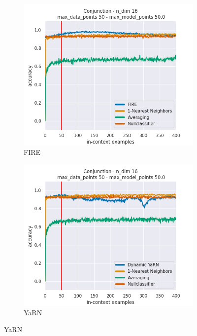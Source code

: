\documentclass[letterpaper]{article} %
\begin{document}
\begin{figure}[tp]
\begin{subfigure}[t]{0.24\linewidth}
    \end{subfigure}
    \begin{subfigure}[t]{0.24\linewidth}
        \includegraphics[width=\linewidth]{AnonymousSubmission/LaTeX/imgs/experiments/conjunction/fire.png}
        \caption{FIRE}
    \end{subfigure}
    \begin{subfigure}[t]{0.24\linewidth}
        \includegraphics[width=\linewidth]{AnonymousSubmission/LaTeX/imgs/experiments/conjunction/dynamic-yarn.png}
        \caption{YaRN}

\end{subfigure}
\end{figure}
\end{document}

